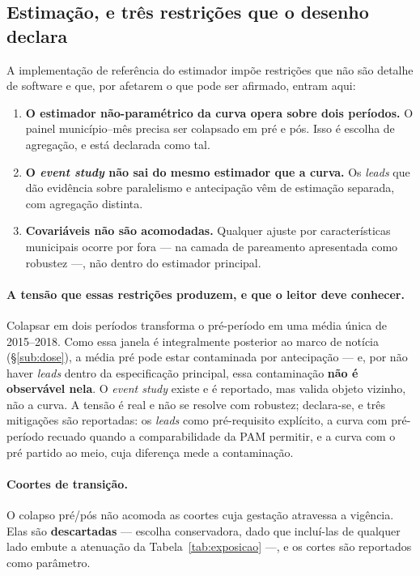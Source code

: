 \subsection{Estimação, e três restrições que o desenho declara}
\label{sub:estimacao}

A implementação de referência do estimador impõe restrições que não são detalhe
de software e que, por afetarem o que pode ser afirmado, entram aqui:

\begin{enumerate}
  \item \textbf{O estimador não-paramétrico da curva opera sobre dois períodos.}
    O painel município--mês precisa ser colapsado em pré e pós. Isso é escolha de
    agregação, e está declarada como tal.
  \item \textbf{O \emph{event study} não sai do mesmo estimador que a curva.} Os
    \emph{leads} que dão evidência sobre paralelismo e antecipação vêm de
    estimação separada, com agregação distinta.
  \item \textbf{Covariáveis não são acomodadas.} Qualquer ajuste por
    características municipais ocorre por fora --- na camada de pareamento
    apresentada como robustez ---, não dentro do estimador principal.
\end{enumerate}

\paragraph{A tensão que essas restrições produzem, e que o leitor deve conhecer.}
Colapsar em dois períodos transforma o pré-período em uma média única de
2015--2018. Como essa janela é integralmente posterior ao marco de notícia
(§\ref{sub:dose}), a média pré pode estar contaminada por antecipação --- e, por
não haver \emph{leads} dentro da especificação principal, essa contaminação
\textbf{não é observável nela}. O \emph{event study} existe e é reportado, mas
valida objeto vizinho, não a curva. A tensão é real e não se resolve com
robustez; declara-se, e três mitigações são reportadas: os \emph{leads} como
pré-requisito explícito, a curva com pré-período recuado quando a
comparabilidade da PAM permitir, e a curva com o pré partido ao meio, cuja
diferença mede a contaminação.

\paragraph{Coortes de transição.} O colapso pré/pós não acomoda as coortes cuja
gestação atravessa a vigência. Elas são \textbf{descartadas} --- escolha
conservadora, dado que incluí-las de qualquer lado embute a atenuação da
Tabela~\ref{tab:exposicao} ---, e os cortes são reportados como parâmetro.


